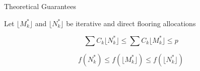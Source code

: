 \documentclass{beamer}
\begin{document}
\begin{frame}{Theoretical Guarantees}

{\footnotesize
Let $\lfloor M_k^* \rfloor$ and $\lfloor N_k^* \rfloor$ be iterative and direct flooring allocations
}
\begin{theorem}
{\footnotesize
\[
\sum C_k \lfloor N_k^* \rfloor \leq \sum C_k \lfloor M_k^* \rfloor \leq p
\]
}
\end{theorem}

\begin{theorem}
{\footnotesize
\[
f(N_k^*) \leq f(\lfloor M_k^* \rfloor) \leq f(\lfloor N_k^* \rfloor)
\]
}
\end{theorem}
\end{frame}
\end{document}
